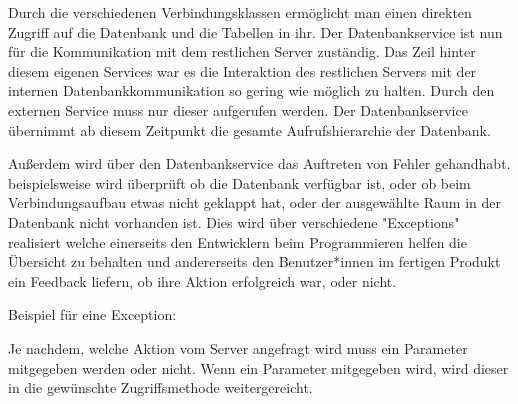 
Durch die verschiedenen Verbindungsklassen ermöglicht man einen direkten Zugriff auf die Datenbank und die Tabellen in ihr. Der Datenbankservice ist nun für die Kommunikation mit dem restlichen Server zuständig. Das Zeil hinter diesem eigenen Services war es die Interaktion des restlichen Servers mit der internen Datenbankkommunikation so gering wie möglich zu halten. Durch den externen Service muss nur dieser aufgerufen werden. Der Datenbankservice übernimmt ab diesem Zeitpunkt die gesamte Aufrufshierarchie der Datenbank.

Außerdem wird über den Datenbankservice das Auftreten von Fehler gehandhabt. beispielsweise wird überprüft ob die Datenbank verfügbar ist, oder ob beim Verbindungsaufbau etwas nicht geklappt hat, oder der ausgewählte Raum in der Datenbank nicht vorhanden ist. Dies wird über verschiedene "Exceptions" realisiert welche einerseits den Entwicklern beim Programmieren helfen die Übersicht zu behalten und andererseits den Benutzer*innen im fertigen Produkt ein Feedback liefern, ob ihre Aktion erfolgreich war, oder nicht.

Beispiel für eine Exception:


Je nachdem, welche Aktion vom Server angefragt wird muss ein Parameter mitgegeben werden oder nicht. Wenn ein Parameter mitgegeben wird, wird dieser in die gewünschte Zugriffsmethode weitergereicht.

